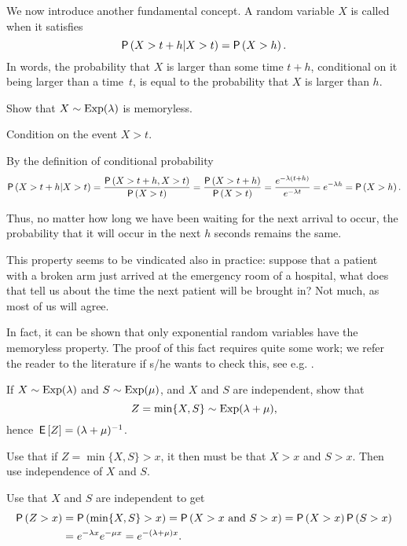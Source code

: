 We now introduce another fundamental concept.
A random variable $X$ is called  when it satisfies
\begin{equation*}
  \P{X > t+h | X>t} = \P{X>h}.
\end{equation*}
In words, the probability that $X$ is larger than some time $t+h$, conditional on it being larger than a time~$t$, is equal to the probability that $X$ is larger than $h$.

\begin{exercise}
  Show that $X\sim \operatorname{Exp}(\lambda)$ is memoryless.

\begin{hint}
Condition on the event ${X>t}$. 
\end{hint}
\begin{solution}
By  the definition of conditional probability
\begin{equation*}
  \P{X>t+h|X>t} = \frac{\P{X>t+h, X>t}}{\P{X>t}} = \frac{\P{X>t+h}}{\P{X>t}} = \frac{e^{-\lambda(t+h)}}{e^{-\lambda t}} = e^{-\lambda h} = \P{X>h}.
\end{equation*}

Thus, no matter how long we have been waiting for the next arrival to occur, the probability that it will occur in the next $h$ seconds remains the same.

This property seems to be vindicated also in practice: suppose that a patient with a broken arm just arrived at the emergency room of a hospital, what does that tell us about the time the next patient will be brought in?
Not much, as most of us will agree.
\end{solution}
\end{exercise}

In fact, it can be shown that only exponential random variables have the memoryless property.
The proof of this fact requires quite some work; we refer the reader to the literature if s/he wants to check this, see e.g.
\citet[Appendix 3]{yushkevich69:_markov_proces}.

\begin{extra}
  If $X\sim\operatorname{Exp}(\lambda)$ and $S\sim\operatorname{Exp}(\mu)$, and $X$ and $S$ are
  independent, show that 
  \begin{equation*}
Z=\min\{X,S\}\sim\operatorname{Exp}(\lambda+\mu),
  \end{equation*}
hence $\,\mathsf{E}\left[Z\right] = (\lambda+\mu)^{-1}$.
\begin{hint}
Use that if $Z=\min\{X, S\}>x$,  it then must be that $X>x$
  and $S>x$. Then use independence of $X$ and $S$.
\end{hint}
\begin{solution}
Use that $X$ and $S$ are independent to get
    \begin{equation*}
      \begin{split}
      \P{Z>x} 
&= \P{\min\{X,S\}>x} = \P{X>x\text{ and } S>x} = \P{X>x}\P{S>x} \\
&= e^{-\lambda x} e^{-\mu x} = e^{-(\lambda+\mu)x}.
      \end{split}
    \end{equation*}
\end{solution}
\end{extra}

